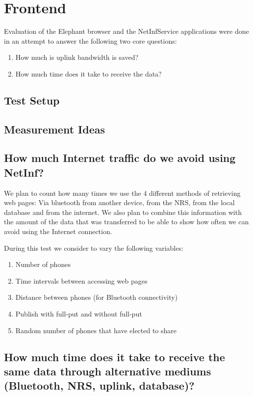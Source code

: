 \section{Frontend}
Evaluation of the Elephant browser and the NetInfService applications were done in an attempt to answer the following two core questions:

\begin{enumerate}
\item How much is uplink bandwidth is saved?
\item How much time does it take to receive the data?
\end{enumerate}

\subsection{Test Setup}

\subsection{Measurement Ideas}
\subsection{How much Internet traffic do we avoid using NetInf?}
We plan to count how many times we use the 4 different methods of retrieving web pages: Via bluetooth from another device, from the NRS, from the local database and from the internet.
We also plan to combine this information with the amount of the data that was transferred to be able to show how often we can avoid using the Internet connection.

During this test we consider to vary the following variables:

\begin{enumerate}
\item Number of phones
\item Time intervals between accessing web pages
\item Distance between phones (for Bluetooth connectivity)
\item Publish with full-put and without full-put
\item Random number of phones that have elected to share
\end{enumerate}

\subsection{How much time does it take to receive the same data through alternative mediums (Bluetooth, NRS, uplink, database)?}

